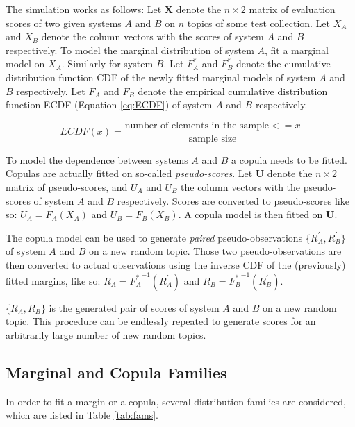 The simulation works as follows: Let $\textbf{X}$ denote the $n \times 2$ matrix of evaluation scores of two given systems $A$ and $B$ on $n$ topics of some test collection. Let $X_A$ and $X_B$ denote the column vectors with the scores of system $A$ and $B$ respectively. To model the marginal distribution of system $A$, fit a marginal model on $X_A$. Similarly for system $B$. Let $F_A^*$ and $F_B^*$ denote the cumulative distribution function CDF of the newly fitted marginal models of system $A$ and $B$ respectively. Let $F_A$ and $F_B$ denote the empirical cumulative distribution function ECDF (Equation \ref{eq:ECDF}) of system $A$ and $B$ respectively. 

\begin{equation}\label{eq:ECDF}
	ECDF(x) = \frac{\text{number of elements in the sample} <= x}{\text{sample size}}
\end{equation}

To model the dependence between systems $A$ and $B$ a copula needs to be fitted. Copulas are actually fitted on so-called \textit{pseudo-scores}. Let $\textbf{U}$ denote the $n \times 2$ matrix of pseudo-scores, and $U_A$ and $U_B$ the column vectors with the pseudo-scores of system $A$ and $B$ respectively. Scores are converted to pseudo-scores like so: $U_A = F_A(X_A)$ and $U_B = F_B(X_B)$. A copula model is then fitted on $\textbf{U}$. 

The copula model can be used to generate \textit{paired} pseudo-observations $\{R_A^\prime, R_B^\prime\}$ of system $A$ and $B$ on a new random topic. Those two pseudo-observations are then converted to actual observations using the inverse CDF of the (previously) fitted margins, like so: $R_A = {F_A^*}^{-1}(R_A^\prime)$ and $R_B = {F_B^*}^{-1}(R_B^\prime)$.

$\{R_A, R_B\}$ is the generated pair of scores of system $A$ and $B$ on a new random topic. This procedure can be endlessly repeated to generate scores for an arbitrarily large number of new random topics.

\subsection{Marginal and Copula Families}\label{sec:families}

In order to fit a margin or a copula, several distribution families are considered, which are listed in Table \ref{tab:fams}.

